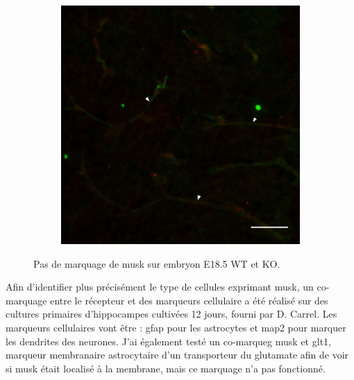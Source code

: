 \begin{figure}[h]
\begin{center}
\begin{subfigure}[h]{0.329\textwidth}
			\end{subfigure}
			\begin{subfigure}[h]{0.329\textwidth}
				\caption{}
				\label{fig:MuskE1KO}
				\includegraphics[width=\textwidth]{./Images/Immuno/Musk/Embryon/E1KO_50um_500px_df.jpg}
			\end{subfigure}
		\end{center}
		\caption{Pas de marquage de \gls{musk} sur embryon E18.5 WT et KO.}
		\label{fig:MuskEmbryon}
	\end{figure}
\FloatBarrier

	Afin d'identifier plus précisément le type de cellules exprimant \gls{musk}, un co-marquage entre le récepteur et des marqueurs cellulaire a été réalisé sur des cultures primaires d'hippocampes cultivées 12 jours, fourni par D. Carrel. Les marqueurs cellulaires vont être : \gls{gfap} pour les astrocytes et \gls{map2} pour marquer les dendrites des neurones. J'ai également testé un co-marqueg \gls{musk} et \gls{glt1}, marqueur membranaire astrocytaire d'un transporteur du glutamate afin de voir si \gls{musk} était localisé à la membrane, mais ce marquage n'a pas fonctionné.
	
